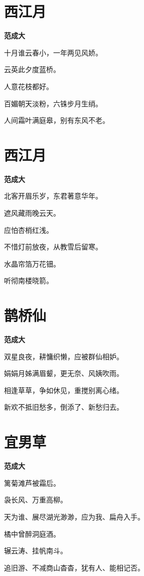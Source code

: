 \documentclass[12pt,a4paper]{ctexbook}
\begin{document}
\section{西江月}
\textbf{范成大}\par\vspace{0.5em}
十月谁云春小，一年两见风娇。\par
云英此夕度蓝桥。\par
人意花枝都好。\par
百媚朝天淡粉，六铢步月生绡。\par
人间霜叶满庭皋，别有东风不老。\par

\section{西江月}
\textbf{范成大}\par\vspace{0.5em}
北客开眉乐岁，东君著意华年。\par
遮风藏雨晚云天。\par
应怕杏梢红浅。\par
不惜灯前放夜，从教雪后留寒。\par
水晶帘箔万花钿。\par
听彻南楼晓箭。\par

\section{鹊桥仙}
\textbf{范成大}\par\vspace{0.5em}
双星良夜，耕慵织懒，应被群仙相妒。\par
娟娟月姊满眉颦，更无奈、风姨吹雨。\par
相逢草草，争如休见，重搅别离心绪。\par
新欢不抵旧愁多，倒添了、新愁归去。\par

\section{宜男草}
\textbf{范成大}\par\vspace{0.5em}
篱菊滩芦被霜后。\par
袅长风、万重高柳。\par
天为谁、展尽湖光渺渺，应为我、扁舟入手。\par
橘中曾醉洞庭酒。\par
辗云涛、挂帆南斗。\par
追旧游、不减商山杳杳，犹有人、能相记否。\par
\end{document}
